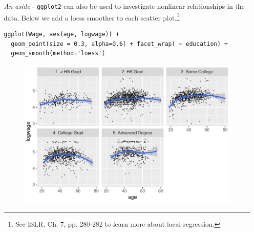 \documentclass[10pt]{beamer}\usepackage[]{graphicx}\usepackage[]{color}
\begin{document}
\begin{frame}[fragile]
\small
\emph{An aside} - \texttt{ggplot2} can also be used to investigate nonlinear relationships in the data.  Below we add a loess smoother to each scatter plot.\footnote{See ISLR, Ch. 7, pp. 280-282 to learn more about local regression.}

\begin{verbatim}
ggplot(Wage, aes(age, logwage)) +
  geom_point(size = 0.3, alpha=0.6) + facet_wrap( ~ education) +
  geom_smooth(method='loess')
\end{verbatim}
\begin{figure}
\includegraphics[scale=0.55]{figure/educ_age_loess_scatter.pdf}
\end{figure}
\end{frame}
\end{document}
